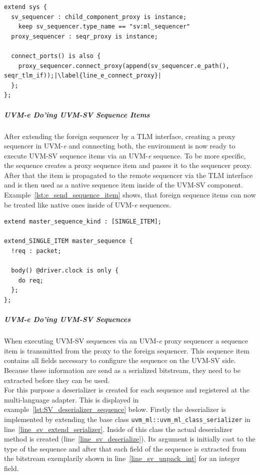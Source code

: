 \begin{lstlisting}[frame=htrbl, caption={\textit{e}: connecting the proxy sequencer and foreign sequencer},
label={lst:e_connect_proxy}]
extend sys {
  sv_sequencer : child_component_proxy is instance;
    keep sv_sequencer.type_name == "sv:ml_sequencer"
  proxy_sequencer : seqr_proxy is instance;
  
  connect_ports() is also {
    proxy_sequencer.connect_proxy(append(sv_sequencer.e_path(), seqr_tlm_if));|\label{line_e_connect_proxy}|
  }; 
};
\end{lstlisting}
\subparagraph{UVM-\textit{e} Do'ing UVM-SV Sequence Items}
After extending the foreign sequencer by a TLM interface, creating a proxy sequencer in UVM-\textit{e} and connecting both, the environment is now ready to execute UVM-SV sequence items via an UVM-\textit{e} sequence. To be more specific, the sequence creates a proxy sequence item and passes it to the sequencer proxy. After that the item is propagated to the remote sequencer via the TLM interface and is then used as a native sequence item inside of the UVM-SV component.\\
Example~\ref{lst:e_send_sequence_item} shows, that foreign sequence items can now be treated like native ones inside of UVM-\textit{e} sequences.
\lstset{language=e, numbers = left, escapechar=|, breaklines=true}
\begin{lstlisting}[frame=htrbl, caption={\textit{e}: sending an UVM-SV sequence item  from  an UVM-\textit{e} sequence},
label={lst:e_send_sequence_item}]
extend master_sequence_kind : [SINGLE_ITEM];

extend_SINGLE_ITEM master_sequence {
  !req : packet;
  
  body() @driver.clock is only {
    do req;
  };
};
\end{lstlisting}
\subparagraph{UVM-\textit{e} Do'ing UVM-SV Sequences}
When executing UVM-SV sequences via an UVM-\textit{e} proxy sequencer a sequence item is transmitted from the proxy to the foreign sequencer. This sequence item contains all fields necessary to configure the sequence on the UVM-SV side. Because these information are send as a serialized bitstream, they need to be extracted before they can be used.\\
For this purpose a deserializer is created for each sequence and registered at the multi-language adapter. This is displayed in example~\ref{lst:SV_deserializer_sequence} below. Firstly the deserializer is implemented by extending the base class \lstinline$uvm_ml::uvm_ml_class_serializer$ in line~\ref{line_sv_extend_serializer}. Inside of this class the actual deserializer method is created (line~\ref{line_sv_deserialize}). Its argument is initially cast to the type of the sequence and after that each field of the sequence is extracted from the bitstream exemplarily shown in line~\ref{line_sv_unpack_int} for an integer field.
